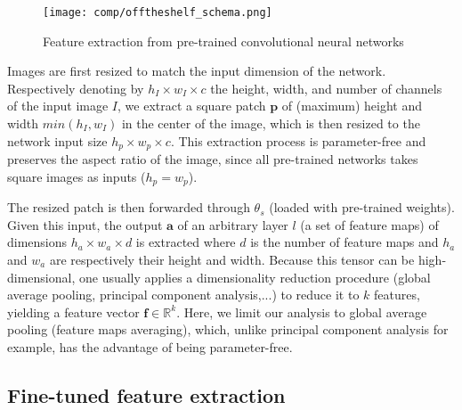 \begin{figure*}
    \center
    \texttt{[image: comp/offtheshelf\_schema.png]}
    \caption{Feature extraction from pre-trained convolutional neural networks}
    \label{fig:comp:diag_feat_extract}
\end{figure*}

Images are first resized to match the input dimension of the network. Respectively denoting by $h_I \times w_I \times c$ the height, width, and number of channels of the input image $I$, we extract a square patch $\mathbf{p}$ of (maximum) height and width $min\left(h_I, w_I\right)$ in the center of the image, which is then resized to the network input size $h_p\times w_p\times c$. This extraction process is parameter-free and preserves the aspect ratio of the image, since all pre-trained networks takes square images as inputs (\ie $h_p=w_p$).

The resized patch is then forwarded through $\theta_s$ (loaded with pre-trained weights). Given this input, the output $\mathbf{a}$ of an arbitrary layer $l$ (\ie a set of feature maps) of dimensions $h_a \times w_a \times d$ is extracted where $d$ is the number of feature maps and $h_a$ and $w_a$ are respectively their height and width. Because this tensor can be high-dimensional, one usually applies a dimensionality reduction procedure (\eg global average pooling, principal component analysis,...) to reduce it to $k$ features, yielding a feature vector $\mathbf{f}\in \mathbb{R}^k$.  Here, we limit our analysis to global average pooling (\ie feature maps averaging), which, unlike principal component analysis for example, has the advantage of being parameter-free.

\subsection{Fine-tuned feature extraction}
\label{ssec:comp:meth_fine_tuning}

